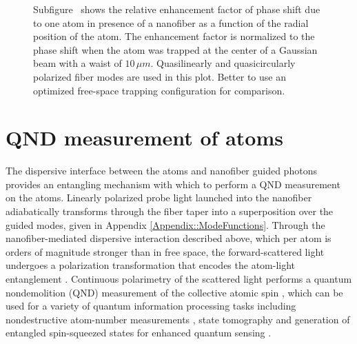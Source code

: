 \documentclass[preprint,aps,pra,onecolumn]{revtex4-1} %
\newcommand{\comment}[1]{{\color{Maroon} #1}}
\begin{document}
\begin{figure}
\begin{minipage}{.49\linewidth}
\centering
{}
\end{minipage}
\caption{Subfigure~\protect{} shows the relative enhancement factor of phase shift due to one atom in presence of a nanofiber as a function of the radial position of the atom. The enhancement factor is normalized to the phase shift when the atom was trapped at the center of a Gaussian beam with a waist of $ 10\,\mu m $. Quasilinearly and quasicircularly polarized fiber modes are used in this plot. \comment{Better to use an optimized free-space trapping configuration for comparison.}}\label{fig:modeparaperty}
\end{figure}


\section{QND measurement of atoms}
The dispersive interface between the atoms and nanofiber guided photons provides an entangling mechanism with which to perform a QND measurement on the atoms.  Linearly polarized probe light launched into the nanofiber adiabatically transforms through the fiber taper into a superposition over the guided modes, given in Appendix \ref{Appendix::ModeFunctions}.  Through the nanofiber-mediated dispersive interaction described above, which per atom is orders of magnitude stronger than in free space, the forward-scattered light undergoes a polarization transformation that encodes the atom-light entanglement \cite{geremia_tensor_2006, deutsch_quantum_2010,hammerer_quantum_2010}.  Continuous polarimetry of the scattered light performs a quantum nondemolition (QND) measurement of the collective atomic spin \cite{chaudhury_continuous_2006}, which can be used for a variety of quantum information processing tasks including nondestructive atom-number measurements \cite{dawkins_dispersive_2011, beguin_generation_2014}, state tomography \cite{smith_quantum_2013} and generation of entangled spin-squeezed states \cite{kuzmich_generation_2000, takano_spin_2009} for enhanced quantum sensing \cite{sewell_magnetic_2012}. 
\end{document}
